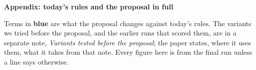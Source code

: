\documentclass[10.5pt,a4paper]{article}
\begin{document}
{\fontsize{11.5pt}{15.5pt}\selectfont\setlength{\parskip}{1ex plus .35fil}

\clearpage}

\clearpage
\setlength{\parskip}{.35ex}
\appendix
{\LARGE\bfseries Appendix: today's rules and the proposal in full\par}\vspace{1.5ex}

\noindent Terms in \textcolor[HTML]{2F74D0}{\textbf{blue}} are what the proposal changes against today's rules. The variants we tried before the proposal, and the earlier runs that scored them, are in a separate note, \emph{Variants tested before the proposal}; the paper states, where it uses them, what it takes from that note. Every figure here is from the final run unless a line says otherwise.
\end{document}
